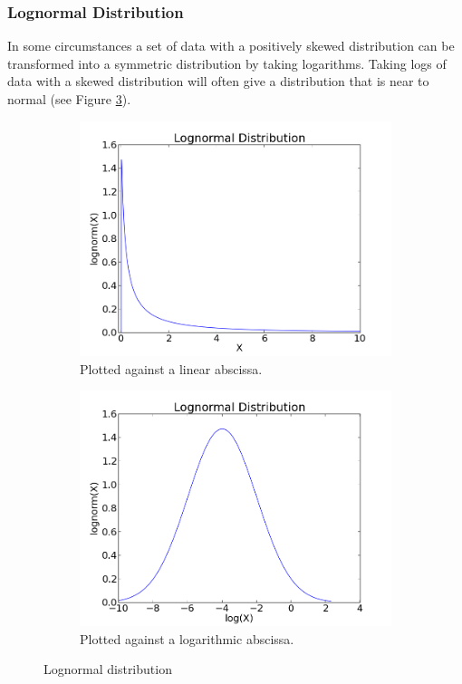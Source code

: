 \subsubsection{Lognormal Distribution}

In some circumstances a set of data with a positively skewed distribution can be transformed into a symmetric distribution by taking logarithms. Taking logs of data with a skewed distribution will often give a distribution that is near to normal (see Figure \ref{fig:lognormal}).

\begin{figure}
\centering
\begin{subfigure}{.5\textwidth}
  \centering
  \includegraphics[width=.8\linewidth]{../Images/LogNormal_Linear.png}
  \caption{Plotted against a linear abscissa.}
  \label{fig:Lognormal_Sub1}
\end{subfigure}%
\begin{subfigure}{.5\textwidth}
  \centering
  \includegraphics[width=.8\linewidth]{../Images/LogNormal_Logarithmic.png}
  \caption{Plotted against a logarithmic abscissa.}
  \label{fig:Lognormal_Sub2}
\end{subfigure}
\caption{Lognormal distribution}
\label{fig:lognormal}
\end{figure}


